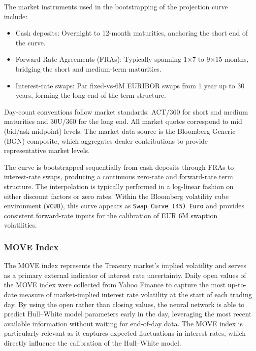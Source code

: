 The market instruments used in the bootstrapping of the projection curve include:
\begin{itemize}
	\item Cash deposits: Overnight to 12-month maturities, anchoring the short end of the curve.
	\item Forward Rate Agreements (FRAs): Typically spanning 1×7 to 9×15 months, bridging the short and medium-term maturities.
	\item Interest-rate swaps: Par fixed-vs-6M EURIBOR swaps from 1 year up to 30 years, forming the long end of the term structure.
\end{itemize}

Day-count conventions follow market standards: ACT/360 for short and medium maturities and 30U/360 for the long end. All market quotes correspond to mid (bid/ask midpoint) levels. The market data source is the Bloomberg Generic (BGN) composite, which aggregates dealer contributions to provide representative market levels.

The curve is bootstrapped sequentially from cash deposits through FRAs to interest-rate swaps, producing a continuous zero-rate and forward-rate term structure. The interpolation is typically performed in a log-linear fashion on either discount factors or zero rates. Within the Bloomberg volatility cube environment (\texttt{VCUB}), this curve appears as \texttt{Swap Curve (45) Euro} and provides consistent forward-rate inputs for the calibration of EUR 6M swaption volatilities.

\subsubsection{MOVE Index}
The MOVE index represents the Treasury market's implied volatility and serves as a primary external indicator of interest rate uncertainty. Daily open values of the MOVE index were collected from Yahoo Finance to capture the most up-to-date measure of market-implied interest rate volatility at the start of each trading day. By using the open rather than closing values, the neural network is able to predict Hull–White model parameters early in the day, leveraging the most recent available information without waiting for end-of-day data. The MOVE index is particularly relevant as it captures expected fluctuations in interest rates, which directly influence the calibration of the Hull–White model.

